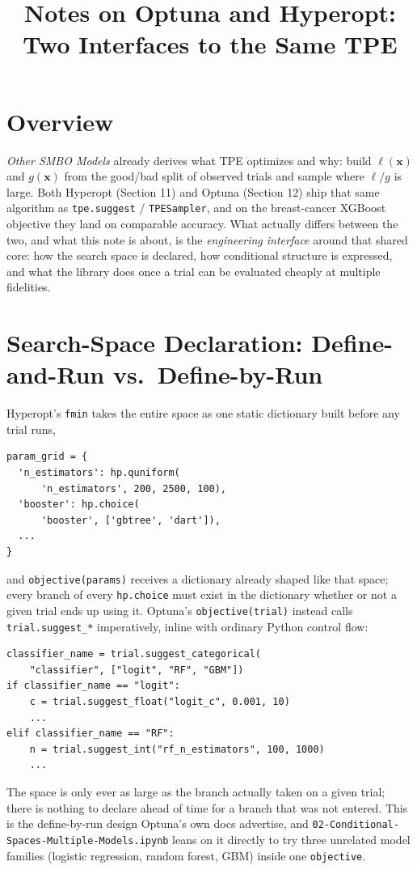 \documentclass[conference]{IEEEtran}
\title{Notes on Optuna and Hyperopt: Two Interfaces to the Same TPE}
\author{
\IEEEauthorblockN{Luis Mendez}
}
\begin{document}
\maketitle

\section*{Overview}
\textit{Other SMBO Models} already derives what TPE optimizes and why: build $\ell(\mathbf{x})$ and $g(\mathbf{x})$ from the good/bad split of observed trials and sample where $\ell/g$ is large. Both Hyperopt (Section 11) and Optuna (Section 12) ship that same algorithm as \texttt{tpe.suggest} / \texttt{TPESampler}, and on the breast-cancer XGBoost objective they land on comparable accuracy. What actually differs between the two, and what this note is about, is the \emph{engineering interface} around that shared core: how the search space is declared, how conditional structure is expressed, and what the library does once a trial can be evaluated cheaply at multiple fidelities.

\section*{Search-Space Declaration: Define-and-Run vs.\ Define-by-Run}
Hyperopt's \texttt{fmin} takes the entire space as one static dictionary built before any trial runs,
\begin{verbatim}
param_grid = {
  'n_estimators': hp.quniform(
      'n_estimators', 200, 2500, 100),
  'booster': hp.choice(
      'booster', ['gbtree', 'dart']),
  ...
}
\end{verbatim}
and \texttt{objective(params)} receives a dictionary already shaped like that space; every branch of every \texttt{hp.choice} must exist in the dictionary whether or not a given trial ends up using it. Optuna's \texttt{objective(trial)} instead calls \texttt{trial.suggest\_*} imperatively, inline with ordinary Python control flow:
\begin{verbatim}
classifier_name = trial.suggest_categorical(
    "classifier", ["logit", "RF", "GBM"])
if classifier_name == "logit":
    c = trial.suggest_float("logit_c", 0.001, 10)
    ...
elif classifier_name == "RF":
    n = trial.suggest_int("rf_n_estimators", 100, 1000)
    ...
\end{verbatim}
The space is only ever as large as the branch actually taken on a given trial; there is nothing to declare ahead of time for a branch that was not entered. This is the define-by-run design Optuna's own docs advertise, and \texttt{02-Conditional-Spaces-Multiple-Models.ipynb} leans on it directly to try three unrelated model families (logistic regression, random forest, GBM) inside one \texttt{objective}.
\end{document}

